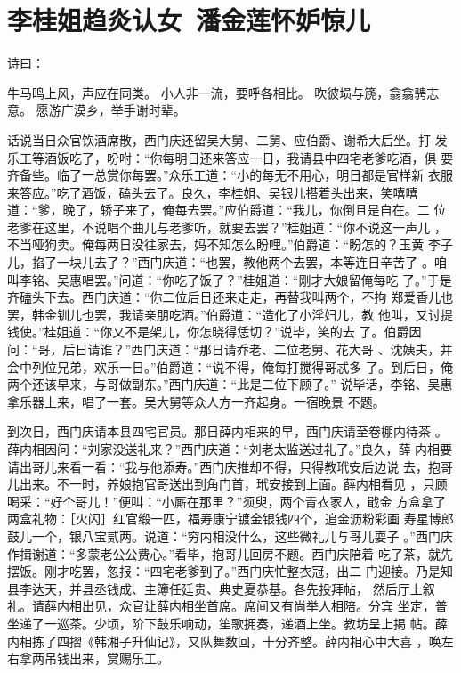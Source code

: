 \chapter{李桂姐趋炎认女~潘金莲怀妒惊儿}

诗曰：

牛马鸣上风，声应在同类。
小人非一流，要呼各相比。
吹彼埙与篪，翕翕骋志意。
愿游广漠乡，举手谢时辈。

话说当日众官饮酒席散，西门庆还留吴大舅、二舅、应伯爵、谢希大后坐。打
发乐工等酒饭吃了，吩咐：“你每明日还来答应一日，我请县中四宅老爹吃酒，俱
要齐备些。临了一总赏你每罢。”众乐工道：“小的每无不用心，明日都是官样新
衣服来答应。”吃了酒饭，磕头去了。良久，李桂姐、吴银儿搭着头出来，笑嘻嘻
道：“爹，晚了，轿子来了，俺每去罢。”应伯爵道：“我儿，你倒且是自在。二
位老爹在这里，不说唱个曲儿与老爹听，就要去罢？”桂姐道：“你不说这一声儿
，不当哑狗卖。俺每两日没往家去，妈不知怎么盼哩。”伯爵道：“盼怎的？玉黄
李子儿，掐了一块儿去了？”西门庆道：“也罢，教他两个去罢，本等连日辛苦了
。咱叫李铭、吴惠唱罢。”问道：“你吃了饭了？”桂姐道：“刚才大娘留俺每吃
了。”于是齐磕头下去。西门庆道：“你二位后日还来走走，再替我叫两个，不拘
郑爱香儿也罢，韩金钏儿也罢，我请亲朋吃酒。”伯爵道：“造化了小淫妇儿，教
他叫，又讨提钱使。”桂姐道：“你又不是架儿，你怎晓得恁切？”说毕，笑的去
了。伯爵因问：“哥，后日请谁？”西门庆道：“那日请乔老、二位老舅、花大哥
、沈姨夫，并会中列位兄弟，欢乐一日。”伯爵道：“说不得，俺每打搅得哥忒多
了。到后日，俺两个还该早来，与哥做副东。”西门庆道：“此是二位下顾了。”
说毕话，李铭、吴惠拿乐器上来，唱了一套。吴大舅等众人方一齐起身。一宿晚景
不题。

到次日，西门庆请本县四宅官员。那日薛内相来的早，西门庆请至卷棚内待茶
。薛内相因问：“刘家没送礼来？”西门庆道：“刘老太监送过礼了。”良久，薛
内相要请出哥儿来看一看：“我与他添寿。”西门庆推却不得，只得教玳安后边说
去，抱哥儿出来。不一时，养娘抱官哥送出到角门首，玳安接到上面。薛内相看见
，只顾喝采：“好个哥儿！”便叫：“小厮在那里？”须臾，两个青衣家人，戢金
方盒拿了两盒礼物：［火闪］红官缎一匹，福寿康宁镀金银钱四个，追金沥粉彩画
寿星博郎鼓儿一个，银八宝贰两。说道：“穷内相没什么，这些微礼儿与哥儿耍子
。”西门庆作揖谢道：“多蒙老公公费心。”看毕，抱哥儿回房不题。西门庆陪着
吃了茶，就先摆饭。刚才吃罢，忽报：“四宅老爹到了。”西门庆忙整衣冠，出二
门迎接。乃是知县李达天，并县丞钱成、主簿任廷贵、典史夏恭基。各先投拜帖，
然后厅上叙礼。请薛内相出见，众官让薛内相坐首席。席间又有尚举人相陪。分宾
坐定，普坐递了一巡茶。少顷，阶下鼓乐响动，笙歌拥奏，递酒上坐。教坊呈上揭
帖。薛内相拣了四摺《韩湘子升仙记》，又队舞数回，十分齐整。薛内相心中大喜
，唤左右拿两吊钱出来，赏赐乐工。

